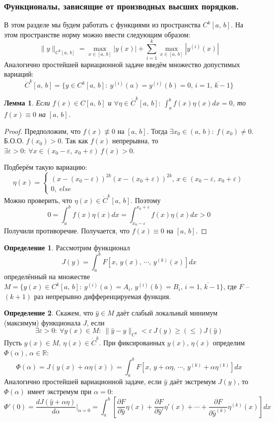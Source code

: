 \documentclass[a4paper,12pt]{article}
\renewcommand{\leq}{\ensuremath{\leqslant}}
\renewcommand{\geq}{\ensuremath{\geqslant}}
\theoremstyle{plain}
\newtheorem{lemma}{Лемма}[section]
\theoremstyle{definition}
\newtheorem{definition}{Определение}[section]
\theoremstyle{remark}
\begin{document}
\subsubsection*{Функционалы, зависящие от производных высших порядков.}
В этом разделе мы будем работать с функциями из пространства $C^k[a,\,b]$. На этом пространстве норму можно ввести следующим образом:
\[\|y\|_{C^k[a,\,b]} = \max_{x \in [a,\,b]} |y(x)| + \sum_{i = 1}^k\max_{x \in [a,\,b]}|y^{(i)}(x)|\]
Аналогично простейшей вариационной задаче введём множество допустимых вариаций:
\[\dot{C}^k[a,\,b] = \{y \in C^k[a,\,b]:\: y^{(i)}(a) = y^{(i)}(b) = 0,\, i = \overline{1,\,k-1}\}\]

\begin{lemma}
	Если $f(x) \in C[a,\,b]$ и $\forall \eta \in \dot{C}^k[a,\,b]:\: \int_a^b f(x)\eta(x)dx = 0$, то $f(x) \equiv 0$ на $[a,\,b]$.
\end{lemma}

\begin{proof}
	Предположим, что $f(x) \not\equiv 0$ на $[a,\,b]$. Тогда $\exists x_0 \in (a,\,b):\: f(x_0) \neq 0$. Б.О.О. $f(x_0) > 0$. Так как $f(x)$ непрерывна, то $\exists \varepsilon > 0:\: \forall x \in (x_0 - \varepsilon,\, x_0 + \varepsilon) \: f(x) > 0$.

	Подберём такую вариацию:
	\[
		\eta(x) = \begin{cases}
			(x - (x_0 - \varepsilon))^{2k}(x - (x_0 + \varepsilon))^{2k},\, x \in (x_0 - \varepsilon,\, x_0 + \varepsilon) \\
			0,\; else
		\end{cases}
	\]
	Можно проверить, что $\eta(x) \in \dot{C}^k[a,\,b]$. Поэтому
	\[0 = \int_a^b f(x)\eta(x)dx = \int_{x_0 - \varepsilon}^{x_0 + \varepsilon}f(x)\eta(x)dx > 0\]
	Получили противоречие. Получается, что $f(x) \equiv 0$ на $[a,\,b]$.
\end{proof}

\begin{definition}
	Рассмотрим функционал
	\[J(y) = \int_a^b F[x,\, y(x),\,\cdots,\, y^{(k)}(x)]dx\]
	определённый на множестве $M = \{y(x) \in C^k[a,\,b]:\: y^{(i)}(a) = A_i,\, y^{(i)}(b) = B_i,\, i = \overline{1,\,k-1}\}$, где $F$ -- $(k + 1)$ раз непрерывно дифференцируемая функция.
\end{definition}

\begin{definition}
	Скажем, что $\hat{y} \in M$ даёт слабый локальный минимум (максимум) функционала $J$, если
	\[\exists \varepsilon > 0:\: \forall y(x) \in M:\: \|\hat{y} - y\|_{C^k} < \varepsilon \: J(y) \geq(\leq) J(\hat{y})\]
	Пусть $y(x) \in M,\, \eta(x) \in \dot{C}^k$. При фиксированных $y(x),\,\eta(x)$ определим $\Phi(\alpha),\, \alpha \in \mathbb{R}$:
	\[\Phi(\alpha) = J(y(x) + \alpha\eta(x)) = \int_a^b F[x,\,y + \alpha\eta,\,\cdots,\,y^{(k)} + \alpha\eta^{(k)}]dx\]
	Аналогично простейшей вариационной задаче, если $\hat{y}$ даёт экстремум $J(y)$, то $\Phi(\alpha)$ имеет экстремум при $\alpha = 0$:
	\[\Phi'(0) = \frac{dJ(\hat{y} + \alpha\eta)}{d\alpha}|_{\alpha = 0} = \int_a^b \left[\frac{\partial F}{\partial \hat{y}}\eta(x) + \frac{\partial F}{\partial \hat{y}'}\eta'(x) + \cdots + \frac{\partial F}{\partial \hat{y}^{(k)}}\eta^{(k)}(x)\right]dx\]
\end{definition}
\end{document}
